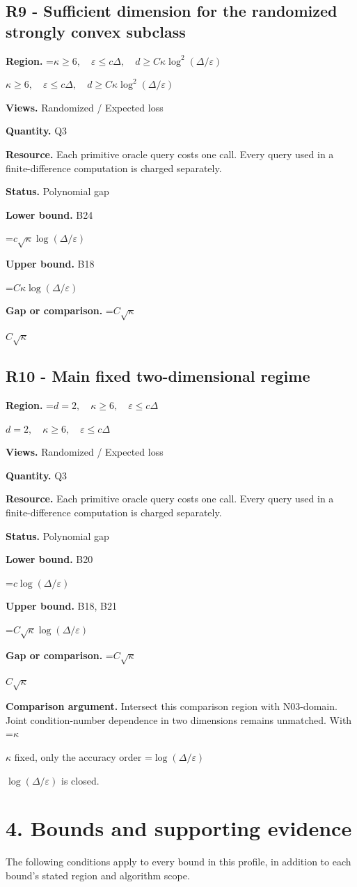 \documentclass[10pt,a4paper]{article}
\newcommand{\AtlasMath}[1]{\par\begingroup\centering\setbox0=\hbox{$\displaystyle #1$}\ifdim\wd0>1.4\linewidth\typeout{ATLAS WIDE FORMULA: \the\wd0}\fi\ifdim\wd0>\linewidth\resizebox{\linewidth}{!}{\box0}\else\box0\fi\par\endgroup}
\newcommand{\AtlasInlineMath}[1]{\begingroup\setbox0=\hbox{$#1$}\ifdim\wd0>.4\linewidth\endgroup\AtlasMath{#1}\else\endgroup$#1$\fi}
\begin{document}
\subsection{R9 - Sufficient dimension for the randomized strongly convex subclass}
\textbf{Region.} \AtlasInlineMath{\kappa\ge6,\quad\varepsilon\le c\Delta,\quad d\ge C\kappa\log^2(\Delta/\varepsilon)}

\textbf{Views.} Randomized / Expected loss

\textbf{Quantity.} Q3

\textbf{Resource.} Each primitive oracle query costs one call. Every query used in a finite-difference computation is charged separately.

\textbf{Status.} Polynomial gap

\textbf{Lower bound.} B24

\AtlasMath{c\sqrt\kappa\log(\Delta/\varepsilon)}
\textbf{Upper bound.} B18

\AtlasMath{C\kappa\log(\Delta/\varepsilon)}
\textbf{Gap or comparison.} \AtlasInlineMath{C\sqrt\kappa}

\subsection{R10 - Main fixed two-dimensional regime}
\textbf{Region.} \AtlasInlineMath{d=2,\quad\kappa\ge6,\quad\varepsilon\le c\Delta}

\textbf{Views.} Randomized / Expected loss

\textbf{Quantity.} Q3

\textbf{Resource.} Each primitive oracle query costs one call. Every query used in a finite-difference computation is charged separately.

\textbf{Status.} Polynomial gap

\textbf{Lower bound.} B20

\AtlasMath{c\log(\Delta/\varepsilon)}
\textbf{Upper bound.} B18, B21

\AtlasMath{C\sqrt\kappa\log(\Delta/\varepsilon)}
\textbf{Gap or comparison.} \AtlasInlineMath{C\sqrt\kappa}

\textbf{Comparison argument.} Intersect this comparison region with N03-domain. Joint condition-number dependence in two dimensions remains unmatched. With \AtlasInlineMath{\kappa} fixed, only the accuracy order \AtlasInlineMath{\log(\Delta/\varepsilon)} is closed.

\section{4. Bounds and supporting evidence}
The following conditions apply to every bound in this profile, in addition to each bound's stated region and algorithm scope.
\end{document}
